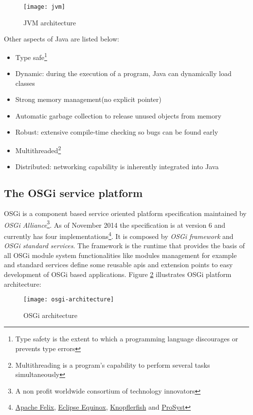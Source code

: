 \begin{figure}[h]
\caption{JVM architecture}
\label{jvm}
\centering
\texttt{[image: jvm]}
\end{figure}  
\FloatBarrier

Other aspects of Java are listed below:   

\begin{itemize}
\item Type safe\footnote{Type safety is the extent to which a programming language discourages or prevents type errors} 
\item Dynamic: during the execution of a program, Java can dynamically load classes 
\item Strong memory management(no explicit pointer)
\item Automatic garbage collection to release unused objects from memory
\item Robust: extensive compile-time checking so bugs can be found early
\item Multithreaded\footnote{Multithreading is a program’s capability to perform several tasks simultaneously}
\item Distributed: networking capability is inherently integrated into Java
\end{itemize}

\subsection{The OSGi service platform}
OSGi is a component based service oriented platform specification maintained by \emph{OSGi Alliance}\footnote{A non profit worldwide consortium of technology innovators}. As of November 2014 the specification is at version 6 and currently has four implementations\footnote{\href{http://felix.apache.org}{Apache Felix}, \href{http://eclipse.org/equinox/}{Eclipse Equinox}, \href{http://www.knopflerfish.org}{Knopflerfish} and \href{http://www.prosyst.com}{ProSyst}}. It is composed by \emph{OSGi framework} and \emph{OSGi standard services}. The framework is the runtime that provides the basis of all OSGi module system functionalities like modules management for example and standard services define some reusable apis and extension points to easy development of OSGi based applications. Figure \ref{osgi architecture} illustrates OSGi platform architecture:

\begin{figure}[h]
\caption{OSGi architecture}
\label{osgi architecture}
\centering
\texttt{[image: osgi-architecture]}
\end{figure}  
\FloatBarrier



